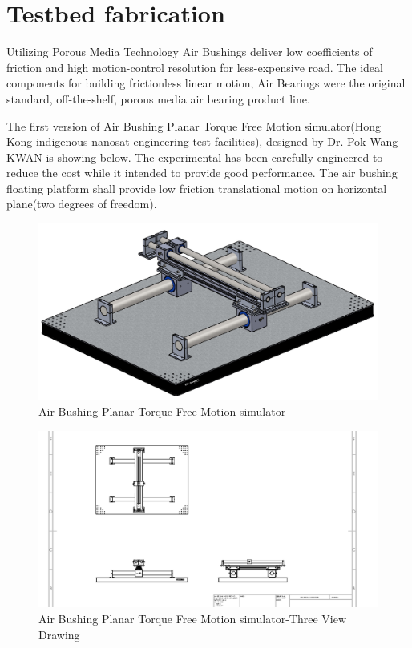 \section{Testbed fabrication}
Utilizing Porous Media Technology Air Bushings deliver low coefficients of friction and high motion-control resolution for less-expensive road. The ideal components for building frictionless linear motion, Air Bearings were the original standard, off-the-shelf, porous media air bearing product line. 

The first version of Air Bushing Planar Torque Free Motion simulator(Hong Kong indigenous nanosat engineering test facilities), designed by Dr. Pok Wang KWAN is showing below. The experimental has been carefully engineered to reduce the cost while it intended to provide good performance. The air bushing floating platform shall provide low friction translational motion on horizontal plane(two degrees of freedom).

\begin{figure}[H]
\centering
\includegraphics[width=\textwidth]{fig/DOE/Original3DView}
\caption{Air Bushing Planar Torque Free Motion simulator}
\end{figure}

\begin{figure}[H]
\centering
\includegraphics[width=\textwidth]{fig/DOE/3viewdrawing}
\caption{Air Bushing Planar Torque Free Motion simulator-Three View Drawing}
\end{figure}

